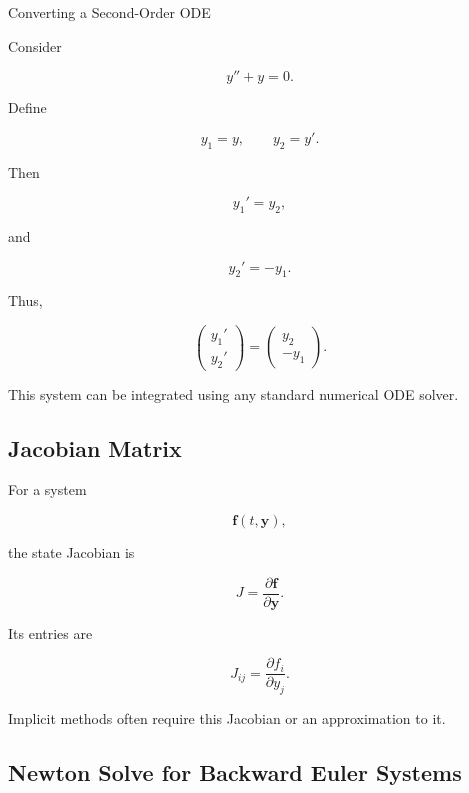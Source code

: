 \begin{workedexamplebox}{Converting a Second-Order ODE}

Consider

\[
y''+y=0.
\]

Define

\[
y_1=y,
\qquad
y_2=y'.
\]

Then

\[
y_1'=y_2,
\]

and

\[
y_2'=-y_1.
\]

Thus,

\begin{answerbox}
\[
\boxed{
\begin{pmatrix}
y_1'\\
y_2'
\end{pmatrix}
=
\begin{pmatrix}
y_2\\
-y_1
\end{pmatrix}.
}
\]
\end{answerbox}

This system can be integrated using any standard numerical ODE solver.

\end{workedexamplebox}

\subsection{Jacobian Matrix}
\label{subsec:ode-jacobian}

For a system

\[
\mathbf{f}
(
t,\mathbf{y}
),
\]

the state Jacobian is

\[
\boxed{
J
=
\frac{
\partial\mathbf{f}
}{
\partial\mathbf{y}
}.
}
\]

Its entries are

\[
\boxed{
J_{ij}
=
\frac{
\partial f_i
}{
\partial y_j
}.
}
\]

Implicit methods often require this Jacobian or an approximation to it.

\subsection{Newton Solve for Backward Euler Systems}
\label{subsec:newton-backward-euler-system}

